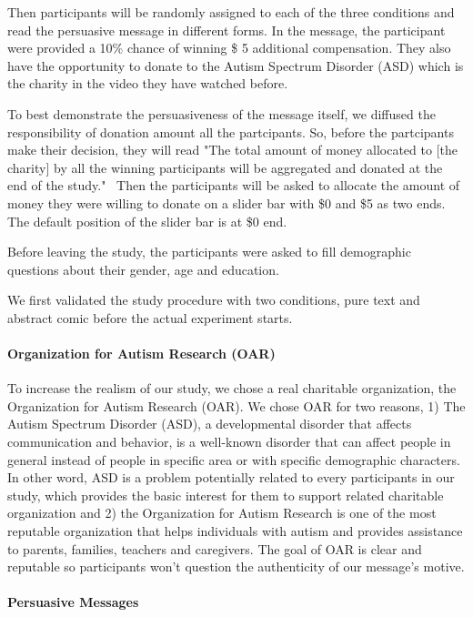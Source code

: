 Then participants will be randomly assigned to each of the three conditions and read the persuasive message in different forms. In the message, the participant were provided a 10\% chance of winning \$ 5 additional compensation. They also have the opportunity to donate to the Autism Spectrum Disorder (ASD) which is the charity in the video they have watched before.

To best demonstrate the persuasiveness of the message itself, we diffused the responsibility of donation amount all the partcipants. So, before the partcipants make their decision, they will read "The total amount of money allocated to [the charity] by all the winning participants will be aggregated and donated at the end of the study."~\cite{} Then the participants will be asked to allocate the amount of money they were willing to donate on a slider bar with \$0 and \$5 as two ends. The default position of the slider bar is at \$0 end.

Before leaving the study, the participants were asked to fill demographic questions about their gender, age and education.

We first validated the study procedure with two conditions, pure text and abstract comic before the actual experiment starts.

\paragraph{Organization for Autism Research (OAR)}
To increase the realism of our study, we chose a real charitable organization, the Organization for Autism Research (OAR). We chose OAR for two reasons, 1) The Autism Spectrum Disorder (ASD), a developmental disorder that affects communication and behavior, is a well-known disorder that can affect people in general instead of people in specific area or with specific demographic characters. In other word, ASD is a problem potentially related to every participants in our study, which provides the basic interest for them to support related charitable organization and 2) the Organization for Autism Research is one of the most reputable organization that helps individuals with autism and provides assistance to parents, families, teachers and caregivers. The goal of OAR is clear and reputable so participants won't question the authenticity of our message's motive.

\paragraph{Persuasive Messages}

